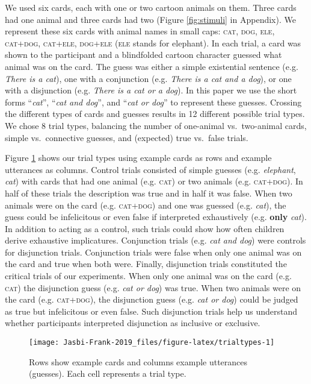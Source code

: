 \documentclass[,man,floatsintext]{apa6}
\begin{document}
We used six cards, each with one or two cartoon animals on them. Three cards had one animal and three cards had two (Figure \ref{fig:stimuli} in Appendix). We represent these six cards with animal names in small caps: \textsc{cat, dog, ele, cat+dog, cat+ele, dog+ele} (\textsc{ele} stands for elephant). In each trial, a card was shown to the participant and a blindfolded cartoon character guessed what animal was on the card. The guess was either a simple existential sentence (e.g. \emph{There is a cat}), one with a conjunction (e.g. \emph{There is a cat and a dog}), or one with a disjunction (e.g. \emph{There is a cat or a dog}). In this paper we use the short forms \enquote{\emph{cat}}, \enquote{\emph{cat and dog}}, and \enquote{\emph{cat or dog}} to represent these guesses. Crossing the different types of cards and guesses results in 12 different possible trial types. We chose 8 trial types, balancing the number of one-animal vs.~two-animal cards, simple vs.~connective guesses, and (expected) true vs.~false trials.

Figure \ref{fig:trialtypes} shows our trial types using example cards as rows and example utterances as columns. Control trials consisted of simple guesses (e.g. \emph{elephant}, \emph{cat}) with cards that had one animal (e.g. \textsc{cat}) or two animals (e.g. \textsc{cat+dog}). In half of these trials the description was true and in half it was false. When two animals were on the card (e.g. \textsc{cat+dog}) and one was guessed (e.g. \emph{cat}), the guess could be infelicitous or even false if interpreted exhaustively (e.g. \textbf{only} \emph{cat}). In addition to acting as a control, such trials could show how often children derive exhaustive implicatures. Conjunction trials (e.g. \emph{cat and dog}) were controls for disjunction trials. Conjunction trials were false when only one animal was on the card and true when both were. Finally, disjunction trials constituted the critical trials of our experiments. When only one animal was on the card (e.g. \textsc{cat}) the disjunction guess (e.g. \emph{cat or dog}) was true. When two animals were on the card (e.g. \textsc{cat+dog}), the disjunction guess (e.g. \emph{cat or dog}) could be judged as true but infelicitous or even false. Such disjunction trials help us understand whether participants interpreted disjunction as inclusive or exclusive.

\begin{figure}

{\centering \texttt{[image: Jasbi-Frank-2019\_files/figure-latex/trialtypes-1]} 

}

\caption{Rows show example cards and columns example utterances (guesses). Each cell represents a trial type.}\label{fig:trialtypes}
\end{figure}
\end{document}
